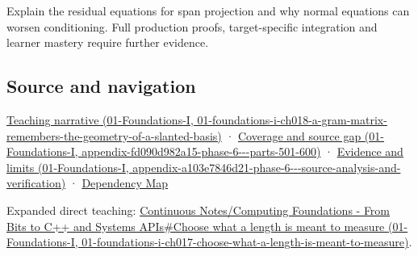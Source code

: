 Explain the residual equations for span projection and why normal equations can worsen conditioning. Full production proofs, target-specific integration and learner mastery require further evidence.

\subsection{Source and navigation}\label{appendix-3b863809f82a-source-and-navigation}

\href{../01-Foundations-I/main.pdf\#nameddest=01-foundations-i-ch018-a-gram-matrix-remembers-the-geometry-of-a-slanted-basis}{Teaching narrative (01-Foundations-I, 01-foundations-i-ch018-a-gram-matrix-remembers-the-geometry-of-a-slanted-basis)} · \href{../01-Foundations-I/main.pdf\#nameddest=appendix-fd090d982a15-phase-6---parts-501-600}{Coverage and source gap (01-Foundations-I, appendix-fd090d982a15-phase-6-\/-\/-parts-501-600)} · \href{../01-Foundations-I/main.pdf\#nameddest=appendix-a103e7846d21-phase-6---source-analysis-and-verification}{Evidence and limits (01-Foundations-I, appendix-a103e7846d21-phase-6-\/-\/-source-analysis-and-verification)} · \hyperref[appendix-4ad47bdd269a]{Dependency Map}

Expanded direct teaching: \href{../01-Foundations-I/main.pdf\#nameddest=01-foundations-i-ch017-choose-what-a-length-is-meant-to-measure}{Continuous Notes/Computing Foundations - From Bits to C++ and Systems APIs\#Choose what a length is meant to measure (01-Foundations-I, 01-foundations-i-ch017-choose-what-a-length-is-meant-to-measure)}.
